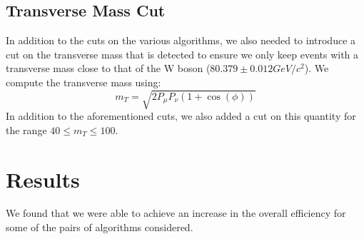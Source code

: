 \subsection{Transverse Mass Cut}
In addition to the cuts on the various algorithms, we also needed to introduce a cut on the transverse mass that is detected to ensure we only keep events with a transverse mass close to that of the W boson ($80.379\pm 0.012 GeV/c^2$). 
We compute the transverse mass using:
$$m_{T}=\sqrt{2P_{\mu}P_{\nu}(1+\cos{(\phi)})}$$
In addition to the aforementioned cuts, we also added a cut on this quantity for the range $40 \leq m_{T} \leq 100$. 
\section{Results}
We found that we were able to achieve an increase in the overall efficiency for some of the pairs of algorithms considered. 

